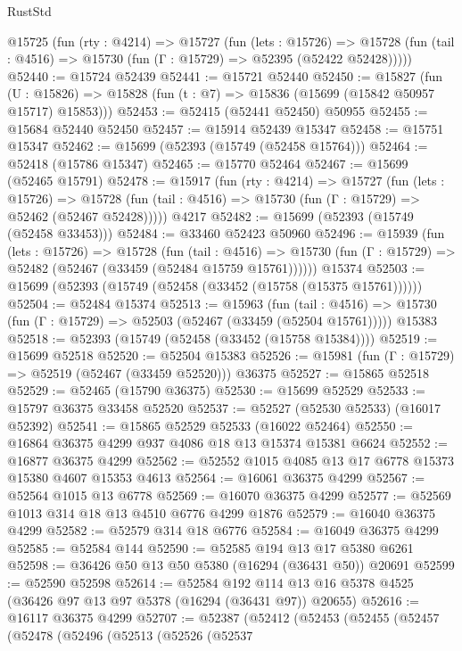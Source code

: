 \begin{lexlean}{RustStd}
\begin{coremodule}
  @15725
    (fun (rty : @4214) =>
    @15727
      (fun (lets : @15726) =>
      @15728 (fun (tail : @4516) => @15730 (fun (Γ : @15729) => @52395 (@52422 @52428)))))
@52440 := @15724 @52439
@52441 := @15721 @52440
@52450 := @15827
    (fun (U : @15826) => @15828 (fun (t : @7) => @15836 (@15699 (@15842 @50957 @15717) @15853)))
@52453 := @52415 (@52441 @52450) @50955
@52455 := @15684 @52440 @52450
@52457 := @15914 @52439 @15347
@52458 := @15751 @15347
@52462 := @15699 (@52393 (@15749 (@52458 @15764)))
@52464 := @52418 (@15786 @15347)
@52465 := @15770 @52464
@52467 := @15699 (@52465 @15791)
@52478 := @15917
    (fun (rty : @4214) =>
    @15727
      (fun (lets : @15726) =>
      @15728 (fun (tail : @4516) => @15730 (fun (Γ : @15729) => @52462 (@52467 @52428)))))
    @4217
@52482 := @15699 (@52393 (@15749 (@52458 @33453)))
@52484 := @33460 @52423 @50960
@52496 := @15939
    (fun (lets : @15726) =>
    @15728
      (fun (tail : @4516) =>
      @15730 (fun (Γ : @15729) => @52482 (@52467 (@33459 (@52484 @15759 @15761))))))
    @15374
@52503 := @15699 (@52393 (@15749 (@52458 (@33452 (@15758 (@15375 @15761))))))
@52504 := @52484 @15374
@52513 := @15963
    (fun (tail : @4516) => @15730 (fun (Γ : @15729) => @52503 (@52467 (@33459 (@52504 @15761)))))
    @15383
@52518 := @52393 (@15749 (@52458 (@33452 (@15758 @15384))))
@52519 := @15699 @52518
@52520 := @52504 @15383
@52526 := @15981 (fun (Γ : @15729) => @52519 (@52467 (@33459 @52520))) @36375
@52527 := @15865 @52518
@52529 := @52465 (@15790 @36375)
@52530 := @15699 @52529
@52533 := @15797 @36375 @33458 @52520
@52537 := @52527 (@52530 @52533) (@16017 @52392)
@52541 := @15865 @52529 @52533 (@16022 @52464)
@52550 := @16864 @36375 @4299 @937 @4086 @18 @13 @15374 @15381 @6624
@52552 := @16877 @36375 @4299
@52562 := @52552 @1015 @4085 @13 @17 @6778 @15373 @15380 @4607 @15353 @4613
@52564 := @16061 @36375 @4299
@52567 := @52564 @1015 @13 @6778
@52569 := @16070 @36375 @4299
@52577 := @52569 @1013 @314 @18 @13 @4510 @6776 @4299 @1876
@52579 := @16040 @36375 @4299
@52582 := @52579 @314 @18 @6776
@52584 := @16049 @36375 @4299
@52585 := @52584 @144
@52590 := @52585 @194 @13 @17 @5380 @6261
@52598 := @36426 @50 @13 @50 @5380 (@16294 (@36431 @50)) @20691
@52599 := @52590 @52598
@52614 := @52584
    @192
    @114
    @13
    @16
    @5378
    @4525
    (@36426 @97 @13 @97 @5378 (@16294 (@36431 @97)) @20655)
@52616 := @16117 @36375 @4299
@52707 := @52387
    (@52412
      (@52453
        (@52455
          (@52457
            (@52478
              (@52496
                (@52513
                  (@52526
                    (@52537

\end{coremodule}
\end{lexlean}
